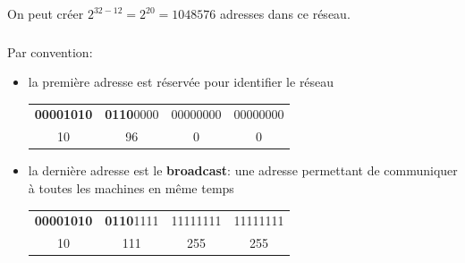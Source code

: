 \documentclass[svgnames,11pt]{beamer}
\begin{document}
\begin{frame}

    On peut créer $2^{32-12}=2^{20} = 1048576$ adresses dans ce réseau.

\end{frame}
\begin{frame}
    \frametitle{}

    \begin{aretenir}[Remarque]
        Par convention:
        \begin{itemize}
            \item <1->la première adresse est réservée pour identifier le réseau
                  \begin{center}
                      \begin{tabular}{cccc}
                          \textbf{00001010} & \textbf{0110}0000 & 00000000 & 00000000 \\
                          10                & 96                & 0        & 0        \\
                      \end{tabular}
                  \end{center}
            \item<2-> la dernière adresse est le \textbf{broadcast}: une adresse permettant de communiquer à toutes les machines en même temps
                  \begin{center}
                      \begin{tabular}{cccc}
                          \textbf{00001010} & \textbf{0110}1111 & 11111111 & 11111111 \\
                          10                & 111               & 255      & 255      \\
                      \end{tabular}
                  \end{center}
        \end{itemize}
    \end{aretenir}

\end{frame}
\end{document}
